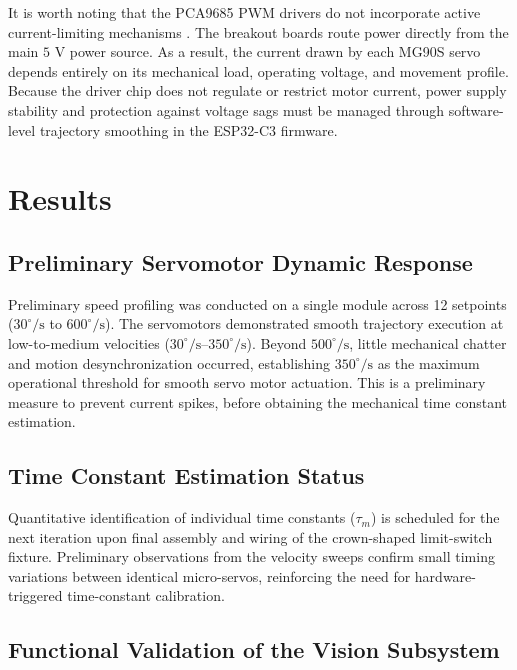 \documentclass[lettersize,journal]{IEEEtran}
\begin{document}
	It is worth noting that the PCA9685 PWM drivers do not incorporate active current-limiting mechanisms \cite{pca9685}. The breakout boards route power directly from the main $5\text{ V}$ power source. As a result, the current drawn by each MG90S servo depends entirely on its mechanical load, operating voltage, and movement profile. Because the driver chip does not regulate or restrict motor current, power supply stability and protection against voltage sags must be managed through software-level trajectory smoothing in the ESP32-C3 firmware.
	
	\section{Results}
	\label{sec:results}
	
	\subsection{Preliminary Servomotor Dynamic Response}
	Preliminary speed profiling was conducted on a single module across 12 setpoints ($30^\circ/\text{s}$ to $600^\circ/\text{s}$). The servomotors demonstrated smooth trajectory execution at low-to-medium velocities ($30^\circ/\text{s}$--$350^\circ/\text{s}$). Beyond $500^\circ/\text{s}$, little mechanical chatter and motion desynchronization occurred, establishing $350^\circ/\text{s}$ as the maximum operational threshold for smooth servo motor actuation. This is a preliminary measure to prevent current spikes, before obtaining the mechanical time constant estimation.
	
	\subsection{Time Constant Estimation Status}
	Quantitative identification of individual time constants ($\tau_m$) is scheduled for the next iteration upon final assembly and wiring of the crown-shaped limit-switch fixture. Preliminary observations from the velocity sweeps confirm small timing variations between identical micro-servos, reinforcing the need for hardware-triggered time-constant calibration.
	
	\subsection{Functional Validation of the Vision Subsystem}
	
\end{document}
